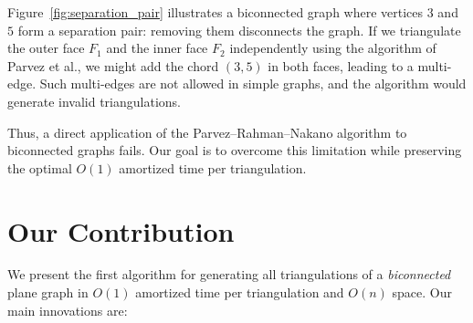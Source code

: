Figure~\ref{fig:separation_pair} illustrates a biconnected graph where vertices \(3\) and \(5\) form a separation pair: removing them disconnects the graph. 
If we triangulate the outer face \(F_1\) and the inner face \(F_2\) independently using the algorithm of Parvez et al., we might add the chord \((3,5)\) in both faces, leading to a multi-edge. 
Such multi-edges are not allowed in simple graphs, and the algorithm would generate invalid triangulations.

Thus, a direct application of the Parvez–Rahman–Nakano algorithm to biconnected graphs fails. 
Our goal is to overcome this limitation while preserving the optimal \(O(1)\) amortized time per triangulation.

\section{Our Contribution}
\label{sec:contribution}

We present the first algorithm for generating all triangulations of a \emph{biconnected} plane graph in \(O(1)\) amortized time per triangulation and \(O(n)\) space. 
Our main innovations are:

